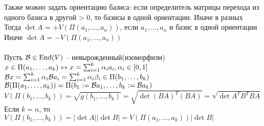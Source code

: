 \documentclass[12pt]{article}
\begin{document}
Также можно задать ориентацию базиса: если определитель матрицы перехода из одного базиса в другой > 0, то базисы в одной ориентации. Иначе в разных\\
Тогда $\det A$ = $+V(\Pi(a_1, \ldots, a_n))$, если $a_1, \ldots, a_n$ и базис в одной ориентации\\
Иначе $\det A$ = $-V(\Pi(a_1, \ldots, a_n))$\\\\
Пусть $\mathcal{B} \in \operatorname{End}(V)$ -- невырожденный(изоморфизм)\\
$x \in \Pi(a_1, \ldots, a_k) \leftrightarrow x = \sum_{i=1}^k \alpha_i a_i, \alpha_i \in [0,1]$\\
$\mathcal B x = \sum_{i=1}^k \alpha_i \mathcal{B} a_i = \sum_{i=1}^k \alpha_i \beta_i \in \Pi(b_1, \ldots, b_k)$\\
$\mathcal{B}(\Pi(a_1, \ldots, a_k)) = \Pi(b_1 := \mathcal{B} a_1, \ldots, b_k := \mathcal{B} a_k)$\\
$V(\Pi(b_1, \ldots, b_k)) = \sqrt{g(b_1, \ldots, b_k)} = \sqrt{\det (BA)^T (BA)} = \sqrt{\det A^TB^TBA}$\\
Если $k = n$, то $V(\Pi(b_1, \ldots, b_k)) = |\det A||\det B| = V(\Pi(a_1, \ldots, a_k)) |\det B|$
\end{document}
